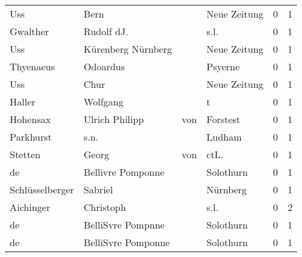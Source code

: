 \begin{center}
\begin{tiny}
\begin{longtabu}{llllrr}
                      Uss &                               Bern &             &                                Neue Zeitung &          0 &         1 \\
                 Gwalther &                         Rudolf dJ. &             &                                        s.l. &          0 &         1 \\
                      Uss &                 Kürenberg Nürnberg &             &                                Neue Zeitung &          0 &         1 \\
                Thyenaeus &                           Odoardus &             &                                     Psyerne &          0 &         1 \\
                      Uss &                               Chur &             &                                Neue Zeitung &          0 &         1 \\
                   Haller &                           Wolfgang &             &                                           t &          0 &         1 \\
                 Hohensax &                     Ulrich Philipp &         von &                                    Forstest &          0 &         1 \\
                Parkhurst &                               s.n. &             &                                      Ludham &          0 &         1 \\
                  Stetten &                              Georg &         von &                                       ctL.  &          0 &         1 \\
                       de &                  Bellivre Pomponne &             &                                   Solothurn &          0 &         1 \\
          Schlüsselberger &                            Sabriel &             &                                    Nürnberg &          0 &         1 \\
                Aichinger &                          Christoph &             &                                        s.l. &          0 &         2 \\
                       de &                  BelliSvre Pompnne &             &                                   Solothurn &          0 &         1 \\
                       de &                 BelliSvre Pomponne &             &                                   Solothurn &          0 &         1 \\

\end{longtabu}
\end{tiny}
\end{center}
